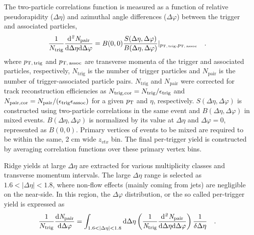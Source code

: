 The two-particle correlations function is measured as a function of relative pseudorapidity ($\Delta\eta$) and azimuthal angle differences ($\Delta\varphi$) between the trigger and associated particles,
\begin{eqnarray}
\frac{1}{N_{\rm{trig}}} \frac{ \rm{d}\it{}^{2} N_{\rm{pair}} }{ \rm{d} \Delta\eta \rm{d}\Delta\varphi} = B(0, 0)\frac{S(\Delta\eta, \Delta\varphi)}{B(\Delta\eta, \Delta\varphi)}  \lvert_{p_\mathrm{T,\,trig},p_\mathrm{T,\,assoc}}   \quad.
\label{eq:corrfunction}
\end{eqnarray}
where $p_\mathrm{T,\,trig}$ and $p_\mathrm{T,\,assoc}$ are transverse momenta of the trigger and associated particles, respectively, $N_\mathrm{trig}$ is the number of trigger particles and $N_\mathrm{pair}$ is the number of trigger-associated particle pairs. $N_\mathrm{trig}$ and $N_\mathrm{pair}$ were corrected for track reconstruction efficiencies as $N_\mathrm{trig,cor} = N_\mathrm{trig}/ \epsilon_{\rm{trig}}$ and $N_\mathrm{pair,cor} = N_\mathrm{pair}/(\epsilon_{\rm{trig}}\epsilon_{\rm{assoc}})$ for a given $p_\mathrm{T}$ and $\eta$, respectively. 
$S (\Delta\eta, \Delta\varphi)$ is constructed using two-particle correlations in the same event and $B(\Delta\eta, \Delta\varphi)$ in mixed events. $B(\Delta\eta, \Delta\varphi)$ is normalized by its value at $\Delta\eta$ and $\Delta\varphi = 0$, represented as $B (0,0)$. Primary vertices of events to be mixed are required to be within the same, 2 cm wide $z_{vtx}$ bin. The final per-trigger yield is constructed by averaging correlation functions over these primary vertex bins.

Ridge yields at large $\Delta\eta$ are extracted for various multiplicity classes and transverse momentum intervals. The large $\Delta\eta$ range is selected as $1.6<|\Delta\eta|<1.8$, where non-flow effects (mainly coming from jets) are negligible on the near-side. In this region, the $\Delta\varphi$ distribution, or the so called per-trigger yield is expressed as
\begin{eqnarray}
\frac{1}{N_{\rm{trig}}} \frac{ \rm{d}\it{}N_{\rm{pair}} }{ \rm{d}\Delta\varphi } = \int_{1.6<|\Delta \eta|<1.8} \rm{d} \Delta \eta \left( \frac{1}{\it{N}_{\rm{trig}}} \frac{ \rm{d}\it{}^{2} N_{\rm{pair}} }{ \rm{d}\Delta\eta d\Delta\varphi} \right) \dfrac{1}{\delta\Delta\eta} \quad.
\end{eqnarray}

